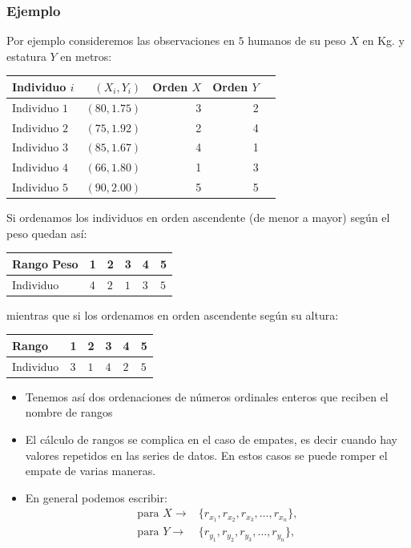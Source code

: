\begin{frame}
\frametitle{Ejemplo}
Por ejemplo consideremos  las observaciones en $5$ humanos de su peso $X$ en Kg. y
estatura $Y$ en metros:

\begin{center}
\begin{tabular}{l|r|r|r|r|}
 Individuo $i$ & $(X_i,Y_i)$ & Orden $X$ & Orden $Y$ \\\hline
 Individuo $1$ & $(80,1.75)$ & 3 & 2 \\
 Individuo $2$ & $(75,1.92)$ & 2 & 4 \\
 Individuo $3$ & $(85,1.67)$ & 4 & 1 \\
 Individuo $4$ & $(66,1.80)$ & 1 & 3 \\
 Individuo $5$ & $(90,2.00)$ & 5 & 5\\\hline
\end{tabular}
\end{center}
\end{frame}

\begin{frame}
Si  ordenamos los individuos en orden ascendente (de menor a mayor) según el peso quedan así:

\begin{center}
\begin{tabular}{l|lllll}
Rango Peso   & 1 & 2 & 3 & 4 & 5\\\hline Individuo & $4$&$2$&$1$&$3$&$5$ \end{tabular}
\end{center}
mientras que si los ordenamos en orden ascendente según su altura:
\begin{center}
\begin{tabular}{l|lllll}
Rango  & 1 & 2 & 3 & 4 & 5\\\hline Individuo & $3$&$1$&$4$&$2$&$5$
 \end{tabular}
\end{center}
\end{frame}

\begin{frame}
\begin{itemize}
\item Tenemos así dos ordenaciones de  números ordinales enteros que reciben el nombre de
rangos
\item El cálculo de rangos se complica en el caso de empates, es decir cuando hay valores repetidos en las series de datos. En estos casos se puede romper el empate de varias maneras.
\item En general podemos escribir:
$$
\begin{array}{cc}
\mbox{para } X \rightarrow & \{r_{x_1},r_{x_2}, r_{x_3},\ldots, r_{x_n}\}, \\ 
\mbox{para } Y \rightarrow & \{r_{y_1},r_{y_2}, r_{y_3},\ldots, r_{y_n}\},
\end{array}
$$
\end{itemize}
\end{frame}

